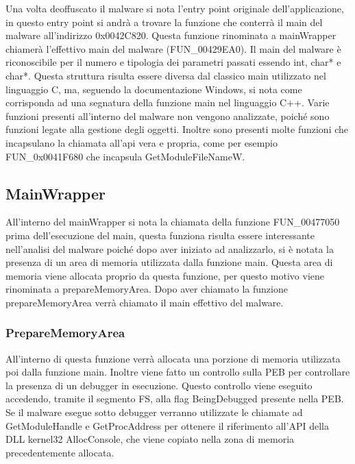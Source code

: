 \documentclass[a4paper,12pt]{article}
\begin{document}
Una volta deoffuscato il malware si nota l'entry point originale dell'applicazione, in questo entry point si andrà a trovare la funzione che conterrà il main del malware all'indirizzo 0x0042C820. Questa funzione rinominata a mainWrapper chiamerà l'effettivo main del malware (FUN\_00429EA0). Il main del malware è riconoscibile per il numero e tipologia dei parametri passati essendo int, char* e char*.  Questa struttura risulta essere diversa dal classico main utilizzato nel linguaggio C, ma, seguendo la documentazione Windows, si nota come corrisponda ad una segnatura della funzione main nel linguaggio C++.  Varie funzioni presenti all'interno del malware non vengono analizzate, poiché sono funzioni legate alla gestione degli oggetti.  Inoltre sono presenti molte funzioni che incapsulano la chiamata all'api vera e propria, come per esempio FUN\_0x0041F680 che incapsula GetModuleFileNameW.

\subsection{MainWrapper}
All'interno del mainWrapper si nota la chiamata della funzione FUN\_00477050 prima dell'esecuzione del main, questa funziona risulta essere interessante nell'analisi del malware poiché dopo aver iniziato ad analizzarlo, si è notata la presenza di un area di memoria utilizzata dalla funzione main. Questa area di memoria viene allocata proprio da questa funzione, per questo motivo viene rinominata a prepareMemoryArea. Dopo aver chiamato la funzione prepareMemoryArea verrà chiamato il main effettivo del malware.

\subsubsection{PrepareMemoryArea}
All'interno di questa funzione verrà allocata una porzione di memoria utilizzata poi dalla funzione main. Inoltre viene fatto un controllo sulla PEB per controllare la presenza di un debugger in esecuzione. Questo controllo viene eseguito accedendo, tramite il segmento FS, alla flag BeingDebugged presente nella PEB. Se il malware esegue sotto debugger verranno utilizzate le chiamate ad GetModuleHandle e GetProcAddress per ottenere il riferimento all'API della DLL kernel32 AllocConsole, che viene copiato nella zona di memoria precedentemente allocata. 
\end{document}

